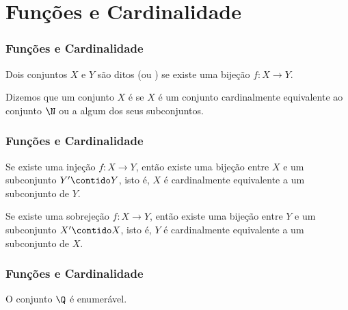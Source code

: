\section{Funções e Cardinalidade}
\begin{frame}
\frametitle{Funções e Cardinalidade} 

\begin{definicao}
Dois conjuntos $X$ e $Y$ são ditos 
(ou ) se existe uma bijeção $f : X \to Y$.
\end{definicao}

\begin{definicao}
Dizemos que um conjunto $X$ é  se $X$ é um conjunto
cardinalmente equivalente ao conjunto $\N$ ou a algum dos seus
subconjuntos.
\end{definicao}


\end{frame}




\begin{frame}
\frametitle{Funções e Cardinalidade} 

\begin{teorema}
Se existe uma injeção $f: X \to Y$, então existe uma bijeção entre
$X$ e um subconjunto $Y' \contido Y$, isto é, $X$ é cardinalmente
equivalente a um subconjunto de $Y$.
\end{teorema} \pause

\begin{teorema}
Se existe uma sobrejeção $f : X \to Y$, então existe uma bijeção
entre $Y$ e um subconjunto $X' \contido X$, isto é, $Y$ é
cardinalmente equivalente a um subconjunto de $X$.
\end{teorema}

\end{frame}


\begin{frame}
\frametitle{Funções e Cardinalidade} 

\begin{exemplo}
O conjunto $\Q$ é enumerável.
\end{exemplo}

\end{frame}


